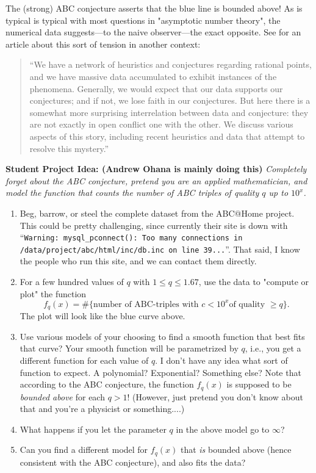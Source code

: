 \documentclass{book}
\begin{document}
The (strong) ABC conjecture asserts that the blue line is bounded above!
As is typical is typical with most questions in "asymptotic number theory",
the numerical data suggests---to the naive observer---the exact opposite.
See \cite{bmsw:bulletins} for an article about this sort of tension in
another context:
\begin{quote}
``We have a network of heuristics and conjectures regarding rational points, and we have massive data accumulated to exhibit instances of the phenomena. Generally, we would expect that our data supports our conjectures; and if not, we lose faith in our conjectures. But here there is a somewhat more surprising interrelation between data and conjecture: they are not exactly in open conflict one with the other. We discuss various aspects of this story, including recent heuristics and data that attempt to resolve this mystery.''
\end{quote}

{\bf Student Project Idea: (Andrew Ohana is mainly doing this)} {\em Completely forget about the ABC
conjecture, pretend you are an applied mathematician,
and model the function that counts the number of ABC
triples of quality $q$ up to $10^x$.}
\begin{enumerate}
\item Beg, barrow, or steel the complete dataset from the ABC@Home
project.  This could be pretty challenging, since currently their
site is down with ``{\tt Warning: mysql\_pconnect(): Too many connections in /data/project/abc/html/inc/db.inc on line 39...}''.  That said, I know the people who run this site,
and we can contact them directly.
\item For a few hundred values of $q$ with $1\leq q\leq 1.67$,
use the data to "compute or plot" the function
$$
f_q(x) = \#\{\text{number of ABC-triples with $c<10^x$
of quality $\geq q$}\}.
$$
The plot will look like the blue curve above.
\item
Use various models of your choosing to find a smooth
function that best fits that curve?  Your smooth
function will be parametrized by $q$, i.e., you get
a different function for each value of $q$.
I don't have any idea what sort of function to expect.
A polynomial?  Exponential?  Something else?  Note that
according to the ABC conjecture, the function $f_q(x)$
is supposed to be {\em bounded above} for each $q>1$!
(However, just pretend you don't know about that and you're
a physicist or something....)
\item What happens if you let the parameter $q$
in the above model go to $\infty$?
\item Can you find a different model for $f_q(x)$ that
{\em is} bounded above (hence consistent with the ABC
conjecture), and also fits the data?
\end{enumerate}
\end{document}
